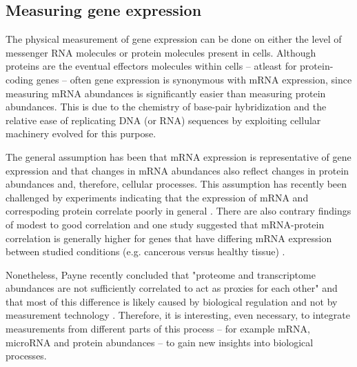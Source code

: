 







\subsection{Measuring gene expression}\label{measurement-of-gene-expression}

The physical measurement of gene expression can be done on either the level of
messenger RNA molecules or protein molecules present in cells. Although
proteins are the eventual effectors molecules within cells -- atleast for
protein-coding genes -- often gene expression is synonymous with mRNA
expression, since measuring mRNA abundances is significantly easier than
measuring protein abundances. This is due to the chemistry of base-pair
hybridization and the relative ease of replicating DNA (or RNA) sequences by
exploiting cellular machinery evolved for this purpose.

The general assumption has been that mRNA expression is representative of gene
expression and that changes in mRNA abundances also reflect changes in protein
abundances and, therefore, cellular processes. This assumption has recently
been challenged by experiments indicating that the expression of mRNA and
correspoding protein correlate poorly in general \citep{tahanOliNiitaRefeja}.
There are also contrary findings of modest to good correlation
and one study suggested that mRNA-protein correlation is generally higher for
genes that have differing mRNA expression between studied conditions
(e.g. cancerous versus healthy tissue) \citep{seYksPaperi}.

Nonetheless, Payne recently concluded that "proteome and transcriptome abundances are not
sufficiently correlated to act as proxies for each other" and that
most of this difference is likely caused by biological regulation and not
by measurement technology \cite{Payne2015}.
Therefore, it is interesting, even necessary, to integrate
measurements from different parts of this process -- for example
mRNA, microRNA and protein abundances -- to gain new insights
into biological processes.

